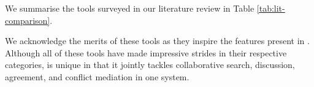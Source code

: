 We summarise the tools surveyed in our literature review in Table \ref{tab:lit-comparison}. 

We acknowledge the merits of these tools as they inspire the features present in \tool. Although all of these tools have made impressive strides in their respective categories, \tool is unique in that it jointly tackles collaborative search, discussion, agreement, and conflict mediation in one system. 